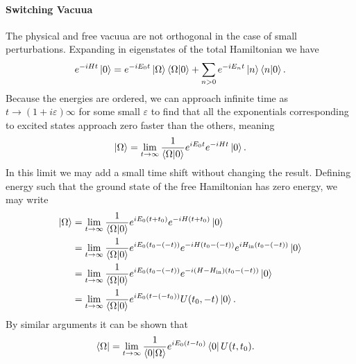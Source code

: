 \paragraph{Switching Vacuua}
The physical and free vacuua are not orthogonal in the case of small perturbations. Expanding in eigenstates of the total Hamiltonian we have
\begin{align*}
	e^{-iHt}\ket{0} = e^{-iE_{0}t}\ket{\Omega}\braket{\Omega}{0} + \sum\limits_{n > 0}e^{-iE_{n}t}\ket{n}\braket{n}{0}.
\end{align*}
Because the energies are ordered, we can approach infinite time as $t\to (1 + i\varepsilon)\infty$ for some small $\varepsilon$ to find that all the exponentials corresponding to excited states approach zero faster than the others, meaning
\begin{align*}
	\ket{\Omega} = \lim\limits_{t\to\infty}\frac{1}{\braket{\Omega}{0}}e^{iE_{0}t}e^{-iHt}\ket{0}.
\end{align*}
In this limit we may add a small time shift without changing the result. Defining energy such that the ground state of the free Hamiltonian has zero energy, we may write
\begin{align*}
	\ket{\Omega} &= \lim\limits_{t\to\infty}\frac{1}{\braket{\Omega}{0}}e^{iE_{0}(t + t_{0})}e^{-iH(t + t_{0})}\ket{0} \\
	             &= \lim\limits_{t\to\infty}\frac{1}{\braket{\Omega}{0}}e^{iE_{0}(t_{0} - (-t))}e^{-iH(t_{0} - (-t))}e^{iH_{\text{in}}(t_{0} - (-t))}\ket{0} \\
	             &= \lim\limits_{t\to\infty}\frac{1}{\braket{\Omega}{0}}e^{iE_{0}(t_{0} - (-t))}e^{-i(H - H_{\text{in}})(t_{0} - (-t))}\ket{0} \\
	             &= \lim\limits_{t\to\infty}\frac{1}{\braket{\Omega}{0}}e^{iE_{0}(t - (-t_{0}))}U(t_{0}, -t)\ket{0}.
\end{align*}
By similar arguments it can be shown that
\begin{align*}
	\bra{\Omega} &= \lim\limits_{t\to\infty}\frac{1}{\braket{0}{\Omega}}e^{iE_{0}(t - t_{0})}\bra{0}U(t, t_{0}).
\end{align*}

